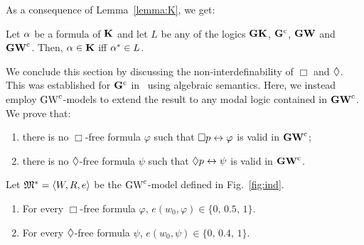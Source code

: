 As a consequence of Lemma~\ref{lemma:K}, we get:

\begin{proposition}\label{prop:embedding}
Let $\alpha$ be a formula of $\mathbf{K}$ and let  $L$ be any of the logics $\mathbf{GK}$, $\mathbf{G}^\mathrm{c}$, $\mathbf{GW}$ and $\mathbf{GW}^\mathrm{c}$.   
Then, $\alpha\in\mathbf{K}$ iff $\alpha^*\in L$.
\end{proposition}


We conclude this section by discussing the non-interdefinability of $\Box$ and $\lozenge$.
This was established for  $\mathbf{G}^\mathrm{c}$ in~\cite{RodriguezV:21}   using algebraic semantics.
Here, we instead employ  $\mbox{$\mathrm{GW}^\mathrm{c}$}$-models  to extend the result to any modal logic contained in $\mathbf{GW}^\mathrm{c}$.
We prove that:

\begin{enumerate}[label=(P\arabic*), ref=(P\arabic*),leftmargin=*]    
\item\label{defBD:P1}
  there is no  $\Box$-free formula $\varphi$ such that
  $\Box p \leftrightarrow\varphi$ is valid in  $\mathbf{GW}^\mathrm{c}$; 
  
\item\label{defBD:P2}
  there is no  $\lozenge$-free formula $\psi$ such that
  $\lozenge p \leftrightarrow\psi$ is valid in  $\mathbf{GW}^\mathrm{c}$. 
  
\end{enumerate}


\begin{lemma}\label{lemma:defBD}
  Let $\mathfrak{M}^\ast=\langle W,R,e \rangle$ be the  $\mbox{$\mathrm{GW}^\mathrm{c}$}$-model defined in Fig.~\ref{fig:ind}.
  \begin{enumerate}[label=(\roman*), ref=(\roman*),leftmargin=*]    
  \item\label{lemma:defBD:1} For every $\Box$-free formula $\varphi$,
    $e(w_0,\varphi)\in\{0,\,0.5,\,1\}$.
    
  \item\label{lemma:defBD:2} For every $\lozenge$-free formula $\psi$,
    $e(w_0,\psi)\in\{0,\,0.4,\,1\}$.
  \end{enumerate}
\end{lemma}

